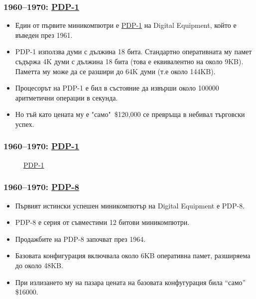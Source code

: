 \documentclass[ignorenonframetext, hyperref=unicode]{beamer}
\begin{document}
\begin{frame}
\frametitle{1960--1970: \href{http://en.wikipedia.org/wiki/PDP-1}{PDP-1}}
\begin{itemize}
  \item Един от първите миникомпютри е
  \href{http://en.wikipedia.org/wiki/PDP-1}{PDP-1} на Digital Equipment, който
  е въведен през 1961.
  \item PDP-1 използва думи с дължина 18 бита. Стандартно оперативната му памет
  съдържа 4K думи с дължина 18 бита (това е еквивалентно на около 9KB). Паметта му
  може да се разшири до 64K думи (т.е около 144KB).
  \item Процесорът на PDP-1 е бил в състояние да извърши около 100000
  аритметични операции в секунда.
  \item Но тъй като цената му е "само"\  \$120,000 се превръща в небивал
  търговски успех.
\end{itemize}
\end{frame}

\begin{frame}
\frametitle{1960--1970: \href{http://en.wikipedia.org/wiki/PDP-1}{PDP-1}}
\begin{figure}
\center
{}
\caption{\href{http://en.wikipedia.org/wiki/Image:Vs-dec-pdp-1.jpg}{PDP-1}}
\end{figure}
\end{frame}

\begin{frame}
\frametitle{1960--1970: \href{http://en.wikipedia.org/wiki/PDP-8}{PDP-8}}
\begin{itemize}
  \item Първият истински успешен миникомпютър на Digital Equipment е PDP-8.
  \item PDP-8 е серия от съвместими 12 битови миникомпютри.
  \item Продажбите на PDP-8 започват през 1964.
  \item Базовата конфигурация включвала около
  6KB оперативна памет, разширяема до около 48KB.
  \item При излизането му на пазара цената на базовата конфугурация била ``само''
  \$16000. 
\end{itemize}
\end{frame}  
\end{document}
